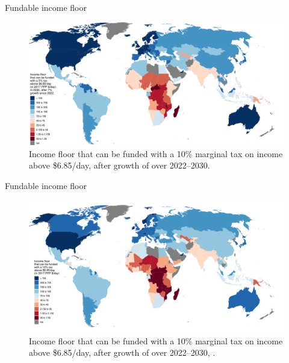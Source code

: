 \documentclass[aspectratio=169,xcolor=dvipsnames, 11pt,mathserif]{beamer}
\begin{document}
\begin{frame}{Fundable income floor}    
    \begin{figure}
      \caption{Income floor that can be funded with a 10\% marginal tax on income above \$6.85/day, after growth of  over 2022--2030. 
      }
      \includegraphics[height=.8\textheight]{../figures/demogrant_7__10_very_optimistic.pdf}
    \end{figure}
\end{frame}

\begin{frame}{Fundable income floor}    
    \begin{figure}
      \caption{Income floor that can be funded with a 10\% marginal tax on income above \$6.85/day, after growth of  over 2022--2030, . 
      }
      \includegraphics[height=.8\textheight]{../figures/s_demogrant_7__10.pdf}
    \end{figure}
\end{frame}
\end{document}
